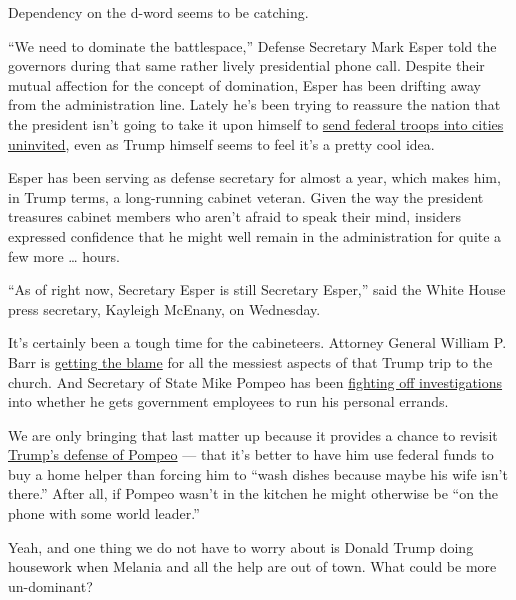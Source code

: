 Dependency on the d-word seems to be catching.

``We need to dominate the battlespace,'' Defense Secretary Mark Esper
told the governors during that same rather lively presidential phone
call. Despite their mutual affection for the concept of domination,
Esper has been drifting away from the administration line. Lately he's
been trying to reassure the nation that the president isn't going to
take it upon himself to
\href{https://www.washingtonpost.com/history/2020/06/03/insurrection-act-trump-history/}{send
federal troops into cities uninvited}, even as Trump himself seems to
feel it's a pretty cool idea.

Esper has been serving as defense secretary for almost a year, which
makes him, in Trump terms, a long-running cabinet veteran. Given the way
the president treasures cabinet members who aren't afraid to speak their
mind, insiders expressed confidence that he might well remain in the
administration for quite a few more \ldots{} hours.

``As of right now, Secretary Esper is still Secretary Esper,'' said the
White House press secretary, Kayleigh McEnany, on Wednesday.

It's certainly been a tough time for the cabineteers. Attorney General
William P. Barr is
\href{https://www.washingtonpost.com/politics/barr-personally-ordered-removal-of-protesters-near-white-house-leading-to-use-of-force-against-largely-peaceful-crowd/2020/06/02/0ca2417c-a4d5-11ea-b473-04905b1af82b_story.html}{getting
the blame} for all the messiest aspects of that Trump trip to the
church. And Secretary of State Mike Pompeo has been
\href{https://www.nytimes3xbfgragh.onion/2020/05/17/us/politics/pompeo-inspector-general-steve-linick.html}{fighting
off investigations} into whether he gets government employees to run his
personal errands.

We are only bringing that last matter up because it provides a chance to
revisit
\href{https://thehill.com/homenews/administration/498403-trump-on-pompeo-id-rather-have-him-working-than-doing-dishes-because}{Trump's
defense of Pompeo} --- that it's better to have him use federal funds to
buy a home helper than forcing him to ``wash dishes because maybe his
wife isn't there.'' After all, if Pompeo wasn't in the kitchen he might
otherwise be ``on the phone with some world leader.''

Yeah, and one thing we do not have to worry about is Donald Trump doing
housework when Melania and all the help are out of town. What could be
more un-dominant?

